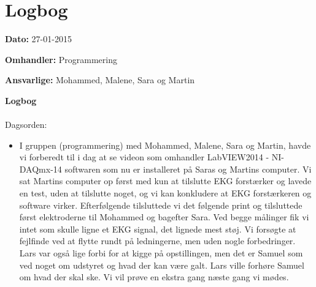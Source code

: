\chapter{Logbog}

\textbf{Dato:} 27-01-2015

\textbf{Omhandler:} Programmering

\textbf{Ansvarlige:} Mohammed, Malene, Sara og Martin

\textbf{Logbog}
\\
\\
Dagsorden:
\begin{itemize}
	\item 

I gruppen (programmering) med Mohammed, Malene, Sara og Martin, havde vi forberedt til i dag at se videon som omhandler LabVIEW2014 - NI-DAQmx-14 softwaren som nu er installeret på Saras og Martins computer. Vi sat Martins computer op først med kun at tilslutte EKG forstærker og lavede en test, uden at tilslutte noget, og vi kan konkludere at EKG forstærkeren og software virker. Efterfølgende tilsluttede vi det følgende print og tilsluttede først elektroderne til Mohammed og bagefter Sara. Ved begge målinger fik vi intet som skulle ligne et EKG signal, det lignede mest støj. Vi forsøgte at fejlfinde ved at flytte rundt på ledningerne, men uden nogle forbedringer. Lars var også lige forbi for at kigge på opstillingen, men det er Samuel som ved noget om udstyret og hvad der kan være galt. Lars ville forhøre Samuel om hvad der skal ske. Vi vil prøve en ekstra gang næste gang vi mødes.
\end{itemize}